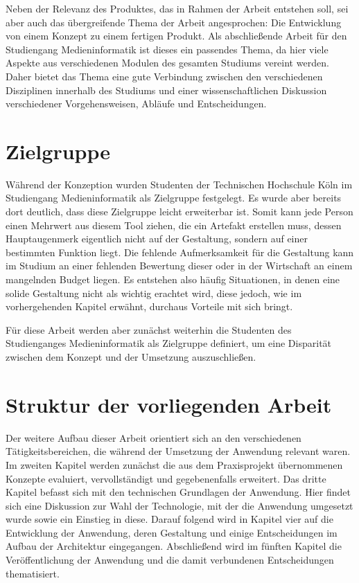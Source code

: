 Neben der Relevanz des Produktes, das in Rahmen der Arbeit entstehen soll, sei aber auch das übergreifende Thema der Arbeit angesprochen: Die Entwicklung von einem Konzept zu einem fertigen Produkt.
Als abschließende Arbeit für den Studiengang Medieninformatik ist dieses ein passendes Thema, da hier viele Aspekte aus verschiedenen Modulen des gesamten Studiums vereint werden. Daher bietet das Thema eine gute Verbindung zwischen den verschiedenen Disziplinen innerhalb des Studiums und einer wissenschaftlichen Diskussion verschiedener Vorgehensweisen, Abläufe und Entscheidungen.


\section{Zielgruppe}
Während der Konzeption wurden Studenten der Technischen Hochschule Köln im Studiengang Medieninformatik als Zielgruppe festgelegt. Es wurde aber bereits dort deutlich, dass diese Zielgruppe leicht erweiterbar ist. Somit kann jede Person einen Mehrwert aus diesem Tool ziehen, die ein Artefakt erstellen muss, dessen Hauptaugenmerk eigentlich nicht auf der Gestaltung, sondern auf einer bestimmten Funktion liegt. Die fehlende Aufmerksamkeit für die Gestaltung kann im Studium an einer fehlenden Bewertung dieser oder in der Wirtschaft an einem mangelnden Budget liegen. Es entstehen also häufig Situationen, in denen eine solide Gestaltung nicht als wichtig erachtet wird, diese jedoch, wie im vorhergehenden Kapitel erwähnt, durchaus Vorteile mit sich bringt.

Für diese Arbeit werden aber zunächst weiterhin die Studenten des Studienganges Medieninformatik als Zielgruppe definiert, um eine Disparität zwischen dem Konzept und der Umsetzung auszuschließen.

\section{Struktur der vorliegenden Arbeit}
Der weitere Aufbau dieser Arbeit orientiert sich an den verschiedenen Tätigkeitsbereichen, die während der Umsetzung der Anwendung relevant waren.\\
Im zweiten Kapitel werden zunächst die aus dem Praxisprojekt übernommenen Konzepte evaluiert, vervollständigt und  gegebenenfalls erweitert.
Das dritte Kapitel befasst sich mit den technischen Grundlagen der Anwendung. Hier findet sich eine Diskussion zur Wahl der Technologie, mit der die Anwendung umgesetzt wurde sowie ein Einstieg in diese.
Darauf folgend wird in Kapitel vier auf die Entwicklung der Anwendung, deren Gestaltung und einige Entscheidungen im Aufbau der Architektur eingegangen.
Abschließend wird im fünften Kapitel die Veröffentlichung der Anwendung und die damit verbundenen Entscheidungen thematisiert.
